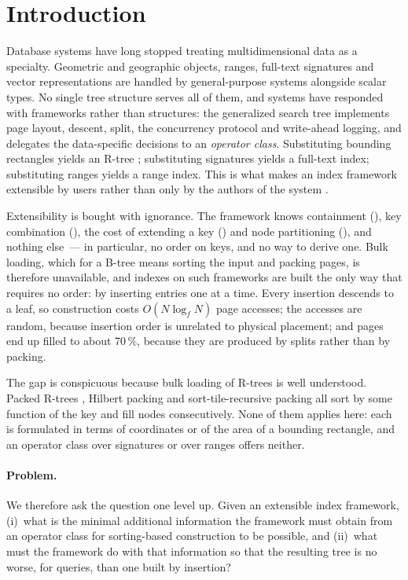 \section{Introduction}

Database systems have long stopped treating multidimensional data as a
specialty. Geometric and geographic objects, ranges, full-text signatures and
vector representations are handled by general-purpose systems alongside scalar
types. No single tree structure serves all of them, and systems have responded
with frameworks rather than structures: the generalized search tree
\cite{hellerstein1995generalized} implements page layout, descent, split, the
concurrency protocol \cite{kornacker1997concurrency} and write-ahead logging,
and delegates the data-specific decisions to an \emph{operator class}.
Substituting bounding rectangles yields an R-tree \cite{guttman1984r};
substituting signatures yields a full-text index; substituting ranges yields a
range index. This is what makes an index framework extensible by users rather
than only by the authors of the system
\cite{chilingarian2004postgresql,rogov2026}.

Extensibility is bought with ignorance. The framework knows containment
(), key combination (), the cost of extending a
key () and node partitioning (), and nothing
else~--- in particular, no order on keys, and no way to derive one. Bulk
loading, which for a B-tree means sorting the input and packing pages, is
therefore unavailable, and indexes on such frameworks are built the only way
that requires no order: by inserting entries one at a time. Every insertion
descends to a leaf, so construction costs $O(N \log_f N)$ page accesses; the
accesses are random, because insertion order is unrelated to physical
placement; and pages end up filled to about 70\,\%, because they are produced
by splits rather than by packing.

The gap is conspicuous because bulk loading of R-trees is well understood.
Packed R-trees \cite{roussopoulos1985direct}, Hilbert packing
\cite{kamel1993hilbert} and sort-tile-recursive packing
\cite{leutenegger1997str} all sort by some function of the key and fill nodes
consecutively. None of them applies here: each is formulated in terms of
coordinates or of the area of a bounding rectangle, and an operator class over
signatures or over ranges offers neither.

\paragraph{Problem.} We therefore ask the question one level up. Given an
extensible index framework, (i)~what is the minimal additional information the
framework must obtain from an operator class for sorting-based construction to
be possible, and (ii)~what must the framework do with that information so that
the resulting tree is no worse, for queries, than one built by insertion?

